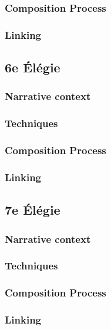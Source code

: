 \documentclass[12pt,twoside,maitrise]{dms}
\theoremstyle{definition}
\begin{document}
\subsubsection{Composition Process}

\subsubsection{Linking}

\subsection{6e Élégie}

\subsubsection{Narrative context}

\subsubsection{Techniques}

\subsubsection{Composition Process}

\subsubsection{Linking}

\subsection{7e Élégie}

\subsubsection{Narrative context}

\subsubsection{Techniques}

\subsubsection{Composition Process}

\subsubsection{Linking}
\end{document}
